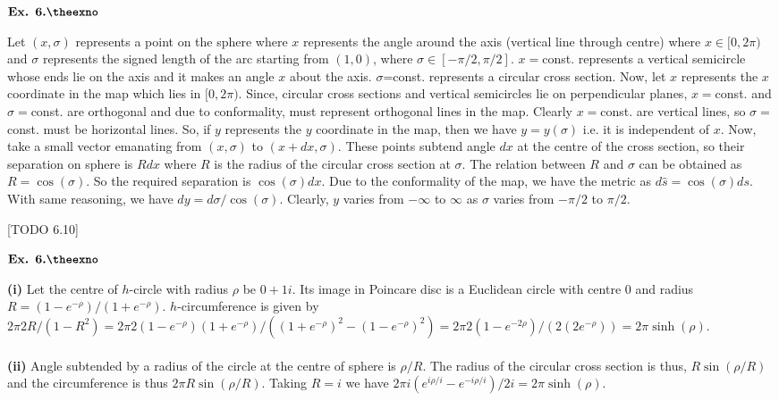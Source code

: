 \documentclass{article}
\def\tf{\textbf}
\newcounter{exno}
\begin{document}
\vspace{0.2in}

${\textbf{Ex. 6.\theexno}}$
\addtocounter{exno}{1}

Let $(x,\sigma)$ represents a point on the sphere where $x$ represents the angle around the axis (vertical line through centre) where $x\in [0,2\pi)$ and $\sigma$ represents the signed length of the arc starting from $(1,0)$, where $\sigma \in [-\pi/2, \pi/2]$. $x=$const. represents a vertical semicircle whose ends lie on the axis and it makes an angle $x$ about the axis. $\sigma$=const. represents a circular cross section. Now, let $x$ represents the $x$ coordinate in the map which lies in $[0,2\pi)$. Since, circular cross sections and vertical semicircles lie on perpendicular planes, $x=$const. and $\sigma=$const. are orthogonal and due to conformality, must represent orthogonal lines in the map. Clearly $x=$const. are vertical lines, so $\sigma=$const. must be horizontal lines. So, if $y$ represents the $y$ coordinate in the map, then we have $y = y(\sigma)$ i.e. it is independent of $x$. Now, take a small vector emanating from $(x,\sigma)$ to $(x+dx,\sigma)$. These points subtend angle $dx$ at the centre of the cross section, so their separation on sphere is $Rdx$ where $R$ is the radius of the circular cross section at $\sigma$. The relation between $R$ and $\sigma$ can be obtained as $R=\cos(\sigma)$. So the required separation is $\cos(\sigma)dx$. Due to the conformality of the map, we have the metric as $d\hat{s} = \cos(\sigma)ds$. With same reasoning, we have $dy = d\sigma/\cos(\sigma)$. Clearly, $y$ varies from $-\infty$ to $\infty$ as $\sigma$ varies from $-\pi/2$ to $\pi/2$.

[TODO 6.10]

\vspace{0.2in}

${\textbf{Ex. 6.\theexno}}$
\addtocounter{exno}{1}

\tf{(i)} Let the centre of $h$-circle with radius $\rho$ be $0+1i$. Its image in Poincare disc is a Euclidean circle with centre $0$ and radius $R=(1-e^{-\rho})/(1+e^{-\rho})$. $h$-circumference is given by $2\pi 2R/(1-R^2) = 2\pi 2(1-e^{-\rho})(1+e^{-\rho})/((1+e^{-\rho})^2-(1-e^{-\rho})^2) = 2\pi 2(1-e^{-2\rho})/(2(2e^{-\rho})) = 2\pi \sinh(\rho)$.\\~\\

\tf{(ii)} Angle subtended by a radius of the circle at the centre of sphere is $\rho/R$. The radius of the circular cross section is thus, $R\sin(\rho/R)$ and the circumference is thus $2\pi R\sin(\rho/R)$. Taking $R=i$ we have $2\pi i (e^{i\rho/i} - e^{-i\rho/i})/2i = 2\pi \sinh(\rho)$.
\end{document}
